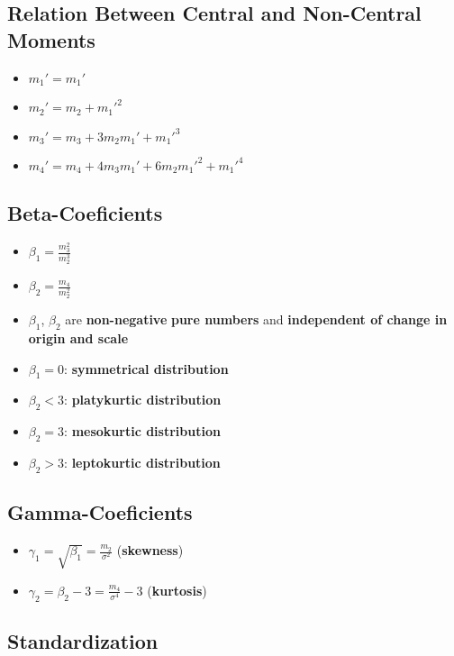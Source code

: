 \subsection*{Relation Between Central and Non-Central Moments}
\begin{itemize}
    \item $m_1' = m_1'$
    \item $m_2' = m_2 + m_1'^2$
    \item $m_3' = m_3 + 3m_2 m_1' + m_1'^3$
    \item $m_4' = m_4 + 4m_3 m_1' + 6m_2 m_1'^2 + m_1'^4$
\end{itemize}

\subsection*{Beta-Coeficients}
\begin{itemize}
    \item $\beta_1 = \frac{m_3^2}{m_2^3}$
    \item $\beta_2 = \frac{m_4}{m_2^2}$
    \item $\beta_1$, $\beta_2$ are \textbf{non-negative} \textbf{pure numbers} and \textbf{independent of change in origin and scale}
    \item $\beta_1 = 0$: \textbf{symmetrical distribution}
    \item $\beta_2 < 3$: \textbf{platykurtic distribution}
    \item $\beta_2 = 3$: \textbf{mesokurtic distribution}
    \item $\beta_2 > 3$: \textbf{leptokurtic distribution}
\end{itemize}

\subsection*{Gamma-Coeficients}
\begin{itemize}
    \item $\gamma_1 = \sqrt{\beta_1} = \frac{m_2}{\sigma^2}$ (\textbf{skewness})
    \item $\gamma_2 = \beta_2 - 3 = \frac{m_4}{\sigma^4} - 3$ (\textbf{kurtosis})
\end{itemize}

\subsection*{Standardization}

